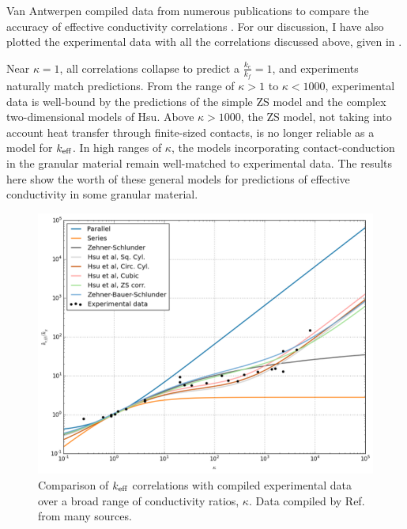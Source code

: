 Van Antwerpen compiled data from numerous publications to compare the accuracy of effective conductivity correlations \cite{VanAntwerpen2010}. For our discussion, I have also plotted the experimental data with all the correlations discussed above, given in .

Near $\kappa = 1$, all correlations collapse to predict a $\frac{k_e}{k_f} = 1$, and experiments naturally match predictions. From the range of $\kappa > 1$ to $\kappa <1000$, experimental data is well-bound by the predictions of the simple ZS model and the complex two-dimensional models of Hsu\etal. Above $\kappa > 1000$, the ZS model, not taking into account heat transfer through finite-sized contacts, is no longer reliable as a model for $k_\text{eff}$. In high ranges of $\kappa$, the models incorporating contact-conduction in the granular material remain well-matched to experimental data. The results here show the worth of these general models for predictions of effective conductivity in some granular material.

\begin{figure}[ht]
    \centering
    \includegraphics[width=\textwidth]{figures/keff-kappa-experimental}
    \caption{Comparison of $k_\text{eff}$ correlations with compiled experimental data over a broad range of conductivity ratios, $\kappa$. Data compiled by Ref.\cite{VanAntwerpen2010} from many sources.}
    \label{fig:kappa-experimental}
\end{figure}

